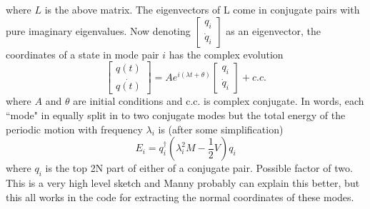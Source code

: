 \documentclass[12pt]{article}
\begin{document}
where $L$ is the above matrix. The eigenvectors of L come in conjugate pairs with pure imaginary eigenvalues. Now denoting 
$\begin{bmatrix} q_i \\ \dot{q}_i \end{bmatrix} $ as an eigenvector, the coordinates of a state in mode pair $i$ has the complex evolution
\begin{equation}
\begin{bmatrix} q(t) \\ \dot{q(t)} \end{bmatrix} = Ae^{i(\lambda t + \theta)} \begin{bmatrix} q_i \\ \dot{q}_i \end{bmatrix} + c.c.
\end{equation}
where $A$ and $\theta$ are initial conditions and c.c. is complex conjugate. In words, each ``mode" in equally split in to two conjugate modes but the total energy 
of the periodic motion with frequency $\lambda_i$ is (after some simplification)
\begin{equation}
E_i = q_i^{\dagger}(\lambda_i^2 M - \frac{1}{2} V) q_i
\end{equation}
where $q_i$ is the top 2N part of either of a conjugate pair. Possible factor of two. This is a very high level sketch and Manny probably can explain this better, but
this all works in the code for extracting the normal coordinates of these modes.
\end{document}
